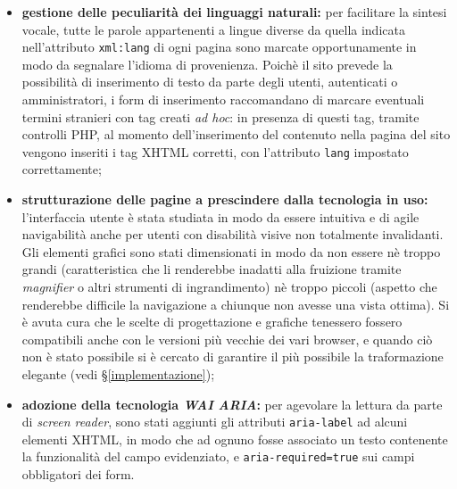 \begin{itemize}
	\item \textbf{gestione delle peculiarità dei linguaggi naturali:} per facilitare la sintesi vocale, tutte le parole appartenenti a lingue diverse da quella indicata nell'attributo \texttt{xml:lang} di ogni pagina sono marcate opportunamente in modo da segnalare l'idioma di provenienza. Poichè il sito prevede la possibilità di inserimento di testo da parte degli utenti, autenticati o amministratori, i form di inserimento raccomandano di marcare eventuali termini stranieri con tag creati \textit{ad hoc}: in presenza di questi tag, tramite controlli PHP, al momento dell'inserimento del contenuto nella pagina del sito vengono inseriti i tag XHTML corretti, con l'attributo \texttt{lang} impostato correttamente;
	
	\item \textbf{strutturazione delle pagine a prescindere dalla tecnologia in uso:} l'interfaccia utente è stata studiata in modo da essere intuitiva e di agile navigabilità anche per utenti con disabilità visive non totalmente invalidanti. Gli elementi grafici sono stati dimensionati in modo da non essere nè troppo grandi (caratteristica che li renderebbe inadatti alla fruizione tramite \textit{magnifier} o altri strumenti di ingrandimento) nè troppo piccoli (aspetto che renderebbe difficile la navigazione a chiunque non avesse una vista ottima). Si è avuta cura che le scelte di progettazione e grafiche tenessero fossero compatibili anche con le versioni più vecchie dei vari browser, e quando ciò non è stato possibile si è cercato di garantire il più possibile la traformazione elegante (vedi §\ref{implementazione});
	
	\item \textbf{adozione della tecnologia \textit{WAI ARIA}:} per agevolare la lettura da parte di \textit{screen reader}, sono stati aggiunti gli attributi \texttt{aria-label}  ad alcuni elementi XHTML, in modo che ad ognuno fosse associato un testo contenente la funzionalità del campo evidenziato, e \texttt{aria-required=true} sui campi obbligatori dei form.
	

\end{itemize}
